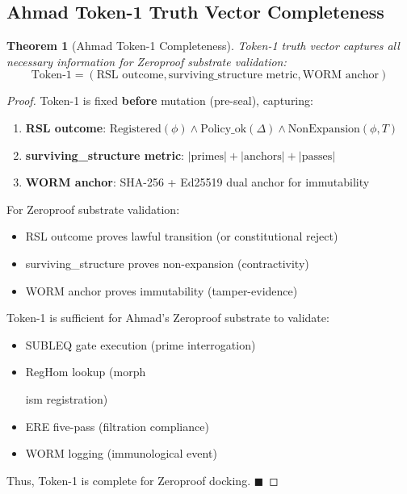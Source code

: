\documentclass[11pt,a4paper]{article}
\newtheorem{theorem}{Theorem}[section]
\begin{document}
\subsection{Ahmad Token-1 Truth Vector Completeness}

\begin{theorem}[Ahmad Token-1 Completeness]\label{thm:ahmad_token1}
Token-1 truth vector captures all necessary information for Zeroproof substrate validation:
$$\text{Token-1} = (\text{RSL outcome}, \text{surviving\_structure metric}, \text{WORM anchor})$$
\end{theorem}

\begin{proof}
Token-1 is fixed \textbf{before} mutation (pre-seal), capturing:
\begin{enumerate}
    \item \textbf{RSL outcome}: $\text{Registered}(\phi) \land \text{Policy\_ok}(\Delta) \land \text{NonExpansion}(\phi, T)$
    \item \textbf{surviving\_structure metric}: $|\text{primes}| + |\text{anchors}| + |\text{passes}|$
    \item \textbf{WORM anchor}: SHA-256 + Ed25519 dual anchor for immutability
\end{enumerate}

For Zeroproof substrate validation:
\begin{itemize}
    \item RSL outcome proves lawful transition (or constitutional reject)
    \item surviving\_structure proves non-expansion (contractivity)
    \item WORM anchor proves immutability (tamper-evidence)
\end{itemize}

Token-1 is sufficient for Ahmad's Zeroproof substrate to validate:
\begin{itemize}
    \item SUBLEQ gate execution (prime interrogation)
    \item RegHom lookup (morph

ism registration)
    \item ERE five-pass (filtration compliance)
    \item WORM logging (immunological event)
\end{itemize}

Thus, Token-1 is complete for Zeroproof docking. \hfill $\blacksquare$
\end{proof}
\end{document}
